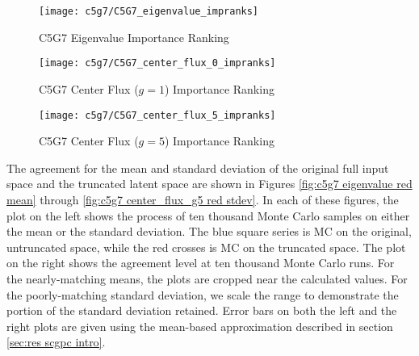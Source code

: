 \begin{figure}[htb]
  \centering
  \texttt{[image: c5g7/C5G7\_eigenvalue\_impranks]}
  \caption{C5G7 Eigenvalue Importance Ranking}
  \label{fig:c5g7 eigenvalue imprank}
\end{figure}
\begin{figure}[htb]
  \centering
  \texttt{[image: c5g7/C5G7\_center\_flux\_0\_impranks]}
  \caption{C5G7 Center Flux ($g=1$) Importance Ranking}
  \label{fig:c5g7 flux 0 imprank}
\end{figure}
\begin{figure}[htb]
  \centering
  \texttt{[image: c5g7/C5G7\_center\_flux\_5\_impranks]}
  \caption{C5G7 Center Flux ($g=5$) Importance Ranking}
  \label{fig:c5g7 flux 5 imprank}
\end{figure}

The agreement for the mean and standard deviation of the original full input space and the truncated latent
space are shown in Figures \ref{fig:c5g7 eigenvalue red mean} through \ref{fig:c5g7 center_flux_g5 red stdev}.
In each of these figures, the plot on the left shows the process of ten thousand Monte Carlo samples on either
the mean or the standard deviation.  The blue square series is MC on the original, untruncated space, while the red
crosses is MC on the truncated space.  The plot on the right shows the agreement level at ten thousand Monte
Carlo runs.  For the nearly-matching means, the plots are cropped near the calculated values.  For the
poorly-matching standard deviation, we scale the range to demonstrate the portion of the standard deviation
retained. Error bars on both the left and the right plots are given using the mean-based approximation described
in section \ref{sec:res scgpc intro}. 

